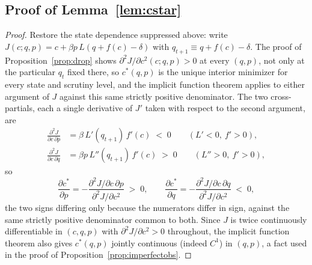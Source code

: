 \subsection{Proof of Lemma~\ref{lem:cstar}}
\begin{proof}
Restore the state dependence suppressed above: write $J(c;q,p) = c + \beta p\, L(q+f(c)-\delta)$ with $q_{t+1} \equiv q+f(c)-\delta$. The proof of Proposition~\ref{prop:drop} shows $\partial^2 J/\partial c^2(c;q,p) > 0$ at every $(q,p)$, not only at the particular $q_t$ fixed there, so $c^*(q,p)$ is the unique interior minimizer for every state and scrutiny level, and the implicit function theorem applies to either argument of $J$ against this same strictly positive denominator. The two cross-partials, each a single derivative of $J'$ taken with respect to the second argument, are
\begin{align*}
\frac{\partial^2 J}{\partial c\, \partial p} &= \beta\, L'(q_{t+1})\, f'(c) \;<\; 0 \qquad (L'<0,\ f'>0), \\
\frac{\partial^2 J}{\partial c\, \partial q} &= \beta p\, L''(q_{t+1})\, f'(c) \;>\; 0 \qquad (L''>0,\ f'>0),
\end{align*}
so
\[
\frac{\partial c^*}{\partial p} = -\frac{\partial^2 J/\partial c\,\partial p}{\partial^2 J/\partial c^2} \;>\; 0, \qquad
\frac{\partial c^*}{\partial q} = -\frac{\partial^2 J/\partial c\,\partial q}{\partial^2 J/\partial c^2} \;<\; 0,
\]
the two signs differing only because the numerators differ in sign, against the same strictly positive denominator common to both. Since $J$ is twice continuously differentiable in $(c,q,p)$ with $\partial^2J/\partial c^2>0$ throughout, the implicit function theorem also gives $c^*(q,p)$ jointly continuous (indeed $C^1$) in $(q,p)$, a fact used in the proof of Proposition~\ref{prop:imperfectobs}.
\end{proof}

